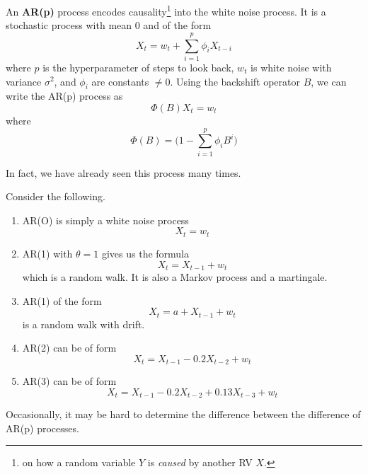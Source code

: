 \documentclass{article}
\begin{document}
    \begin{definition}
      An \textbf{AR(p)} process encodes causality\footnote{on how a random variable $Y$ is \textit{caused} by another RV $X$.} into the white noise process. It is a stochastic process with mean $0$ and of the form 
      \begin{equation}
        X_t = w_t + \sum_{i=1}^p \phi_i X_{t - i}
      \end{equation}
      where $p$ is the hyperparameter of steps to look back, $w_t$ is white noise with variance $\sigma^2$, and $\phi_i$ are constants $\neq 0$. Using the backshift operator $B$, we can write the AR(p) process as 
      \begin{equation}
        \Phi(B) X_t = w_t
      \end{equation}
      where 
      \begin{equation}
        \Phi(B) = \bigg( 1 - \sum_{i=1}^p \phi_i B^i \bigg)
      \end{equation}
    \end{definition}

    In fact, we have already seen this process many times. 
    
    \begin{example}[AR(p) Processes]
      Consider the following. 
      \begin{enumerate}
        \item AR(O) is simply a white noise process 
          \begin{equation}
            X_t = w_t
          \end{equation}
        \item AR(1) with $\theta = 1$ gives us the formula 
          \begin{equation}
            X_t = X_{t-1} + w_t
          \end{equation}
          which is a random walk. It is also a Markov process and a martingale. 
        \item AR(1) of the form 
          \begin{equation}
            X_t = a + X_{t-1} + w_t
          \end{equation}
          is a random walk with drift. 
        \item AR(2) can be of form 
          \begin{equation}
            X_t = X_{t-1} - 0.2 X_{t-2} + w_t
          \end{equation}
        \item AR(3) can be of form 
          \begin{equation}
            X_t = X_{t-1} - 0.2 X_{t-2} + 0.13 X_{t-3} + w_t
          \end{equation}
      \end{enumerate}
      Occasionally, it may be hard to determine the difference between the difference of AR(p) processes. 
    \end{example}
\end{document}
